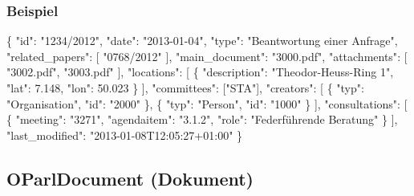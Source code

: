 \documentclass[,a4paper]{article}
\newenvironment{Shaded}{}{}
\newcommand{\DataTypeTok}[1]{\textcolor[rgb]{0.56,0.13,0.00}{{#1}}}
\newcommand{\FloatTok}[1]{\textcolor[rgb]{0.25,0.63,0.44}{{#1}}}
\newcommand{\StringTok}[1]{\textcolor[rgb]{0.25,0.44,0.63}{{#1}}}
\newcommand{\NormalTok}[1]{{#1}}
\begin{document}
\subsubsection{Beispiel}

\begin{Shaded}
\begin{Highlighting}[]
\NormalTok{\{}
    \DataTypeTok{"id"}\NormalTok{: }\StringTok{"1234/2012"}\NormalTok{,}
    \DataTypeTok{"date"}\NormalTok{: }\StringTok{"2013-01-04"}\NormalTok{,}
    \DataTypeTok{"type"}\NormalTok{: }\StringTok{"Beantwortung einer Anfrage"}\NormalTok{,}
    \DataTypeTok{"related_papers"}\NormalTok{: [}
        \StringTok{"0768/2012"}
    \NormalTok{],}
    \DataTypeTok{"main_document"}\NormalTok{: }\StringTok{"3000.pdf"}\NormalTok{,}
    \DataTypeTok{"attachments"}\NormalTok{: [}
        \StringTok{"3002.pdf"}\NormalTok{,}
        \StringTok{"3003.pdf"}
    \NormalTok{],}
    \DataTypeTok{"locations"}\NormalTok{: [}
        \NormalTok{\{}
            \DataTypeTok{"description"}\NormalTok{: }\StringTok{"Theodor-Heuss-Ring 1"}\NormalTok{,}
            \DataTypeTok{"lat"}\NormalTok{: }\FloatTok{7.148}\NormalTok{,}
            \DataTypeTok{"lon"}\NormalTok{: }\FloatTok{50.023}
        \NormalTok{\}}
    \NormalTok{],}
    \DataTypeTok{"committees"}\NormalTok{: [}\StringTok{"STA"}\NormalTok{],}
    \DataTypeTok{"creators"}\NormalTok{: [}
        \NormalTok{\{}
            \DataTypeTok{"typ"}\NormalTok{: }\StringTok{"Organisation"}\NormalTok{,}
            \DataTypeTok{"id"}\NormalTok{: }\StringTok{"2000"}
        \NormalTok{\},}
        \NormalTok{\{}
            \DataTypeTok{"typ"}\NormalTok{: }\StringTok{"Person"}\NormalTok{,}
            \DataTypeTok{"id"}\NormalTok{: }\StringTok{"1000"}
        \NormalTok{\}}
    \NormalTok{],}
    \DataTypeTok{"consultations"}\NormalTok{: [}
        \NormalTok{\{}
            \DataTypeTok{"meeting"}\NormalTok{: }\StringTok{"3271"}\NormalTok{,}
            \DataTypeTok{"agendaitem"}\NormalTok{: }\StringTok{"3.1.2"}\NormalTok{,}
            \DataTypeTok{"role"}\NormalTok{: }\StringTok{"Federführende Beratung"}
        \NormalTok{\}}
    \NormalTok{],}
    \DataTypeTok{"last_modified"}\NormalTok{: }\StringTok{"2013-01-08T12:05:27+01:00"}
\NormalTok{\}}
\end{Highlighting}
\end{Shaded}

\subsection{OParlDocument (Dokument)}
\end{document}
